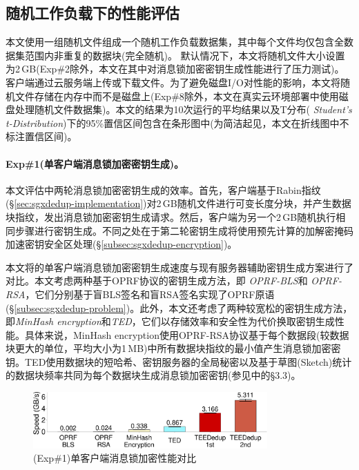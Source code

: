\subsection{随机工作负载下的性能评估}
\label{subsec:sgxdedup-synthetic}

本文使用一组随机文件组成一个随机工作负载数据集，其中每个文件均仅包含全数据集范围内非重复的数据块(完全随机)。 默认情况下，本文将随机文件大小设置为2\,GB(Exp\#2除外，本文在其中对消息锁加密密钥生成性能进行了压力测试)。 客户端通过云服务端上传或下载文件。为了避免磁盘I/O对性能的影响，本文将随机文件存储在内存中而不是磁盘上(Exp\#8除外，本文在真实云环境部署中使用磁盘处理随机文件数据集)。本文的结果为10次运行的平均结果以及T分布(\textit{ Student's t-Distribution})下的95\%置信区间包含在条形图中(为简洁起见，本文在折线图中不标注置信区间)。

\paragraph*{Exp\#1(单客户端消息锁加密密钥生成)。}本文评估\sysnameS 中两轮消息锁加密密钥生成的效率。首先，客户端基于Rabin指纹(\S\ref{sec:sgxdedup-implementation})对2\,GB随机文件进行可变长度分块，并产生数据块指纹，发出消息锁加密密钥生成请求。然后，客户端为另一个2\,GB随机执行相同步骤进行密钥生成。不同之处在于第二轮密钥生成将使用预先计算的加解密掩码加速密钥安全区处理(\S\ref{subsec:sgxdedup-encryption})。

本文将\sysnameS 的单客户端消息锁加密密钥生成速度与现有服务器辅助密钥生成方案进行了对比。本文考虑两种基于OPRF协议的密钥生成方法，即 \textit{OPRF-BLS}\cite{armknecht2015transparent}和\textit{ OPRF-RSA}\cite{bellare2013DupLESS}，它们分别基于盲BLS签名和盲RSA签名实现了OPRF原语(\S\ref{subsec:sgxdedup-problem})。此外，本文还考虑了两种较宽松的密钥生成方法，即\textit{MinHash encryption}\cite{qin17}和\textit{TED}\cite{li2020TED}，它们以存储效率和安全性为代价换取密钥生成性能。具体来说，MinHash encryption使用OPRF-RSA协议基于每个数据段(较数据块更大的单位，平均大小为1\,MB)中所有数据块指纹的最小值产生消息锁加密密钥。TED使用数据块的短哈希、密钥服务器的全局秘密以及基于草图(Sketch)统计的数据块频率共同为每个数据块生成消息锁加密密钥(参见\cite{li2020TED}中的\S3.3)。

\begin{figure}[!htb]
    \centering
    \includegraphics[width=0.8\textwidth]{pic/sgxdedup/expa2_keyGenPerformance.pdf}
    \caption{(Exp\#1)单客户端消息锁加密性能对比}
    \label{fig:sgxdedup-keygen-comparison}
\end{figure}

